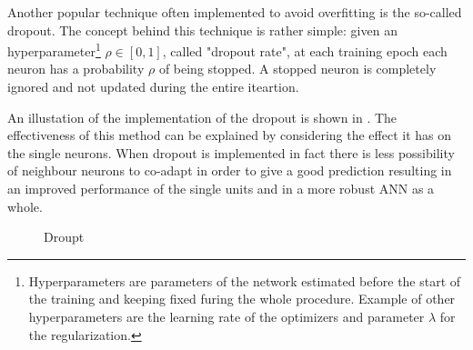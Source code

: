 Another popular technique often implemented to avoid overfitting is the so-called dropout. The concept behind this technique is rather simple: given an hyperparameter\footnote{Hyperparameters are parameters of the network estimated before the start of the training and keeping fixed furing the whole procedure. Example of other hyperparameters are the learning rate of the optimizers and parameter $\lambda$ for the regularization.} $\rho\in [0,1]$, called "dropout rate", at each training epoch each neuron has a probability $\rho$ of being stopped. A stopped neuron is completely ignored and not updated during the entire iteartion.

An illustation of the implementation of the dropout is shown in . The effectiveness of this method can be explained by considering the effect it has on the single neurons. When dropout is implemented in fact there is less possibility of neighbour neurons to co-adapt in order to give a good prediction resulting in an improved performance of the single units and in a more robust ANN as a whole.

\begin{figure}
    \centering

\caption{Droupt}
    \label{fig:dropout}
\end{figure}



